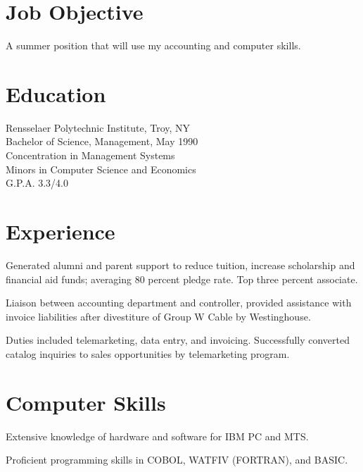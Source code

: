 \documentclass[10pt]{resume}
\begin{document}
\maketitle
{}

\section{Job Objective} 

A summer position that will use my accounting and computer
skills.          
 
\section{Education}  
        
Rensselaer Polytechnic Institute, Troy, NY  \\        
Bachelor of Science, Management, May 1990   \\       
Concentration in Management Systems       \\   
Minors in Computer Science and Economics  \\        
G.P.A. 3.3/4.0    

\section{Experience}
Generated alumni and parent support to reduce tuition,          
increase scholarship and financial aid funds; averaging 80          
percent pledge rate. Top three percent associate.

Liaison between accounting department and controller,          
provided assistance with invoice liabilities after          
divestiture of Group W Cable by Westinghouse.

Duties included telemarketing, data entry, and invoicing.          
Successfully converted catalog inquiries to sales          
opportunities by telemarketing program.          


\section{Computer Skills}  
\begin{bullets}
\item Extensive knowledge of hardware and software for IBM PC and MTS. \\
\item Proficient programming skills in COBOL, WATFIV (FORTRAN), and BASIC.
\end{bullets}
 
\end{document}
